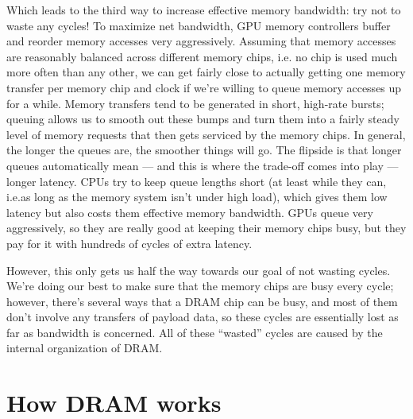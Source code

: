 Which leads to the third way to increase effective memory bandwidth: try not to waste any cycles! To
maximize net bandwidth, GPU memory controllers buffer and reorder memory accesses very aggressively.
Assuming that memory accesses are reasonably balanced across different memory chips, i.e. no chip is used
much more often than any other, we can get fairly close to actually getting one memory transfer per memory
chip and clock if we're willing to queue memory accesses up for a while. Memory transfers tend to be generated
in short, high-rate bursts; queuing allows us to smooth out these bumps and turn them into a fairly steady
level of memory requests that then gets serviced by the memory chips. In general, the longer the queues are,
the smoother things will go. The flipside is that longer queues automatically mean --- and this is where the
trade-off comes into play --- longer latency. CPUs try to keep queue lengths short (at least while they can,
i.e.\@ as long as the memory system isn't under high load), which gives them low latency but also costs them
effective memory bandwidth. GPUs queue very aggressively, so they are really good at keeping their memory chips
busy, but they pay for it with hundreds of cycles of extra latency.

However, this only gets us half the way towards our goal of not wasting cycles. We're doing our best to make
sure that the memory chips are busy every cycle; however, there's several ways that a DRAM chip can be busy,
and most of them don't involve any transfers of payload data, so these cycles are essentially lost as far as
bandwidth is concerned. All of these ``wasted'' cycles are caused by the internal organization of DRAM.

\section{How DRAM works}

{}
